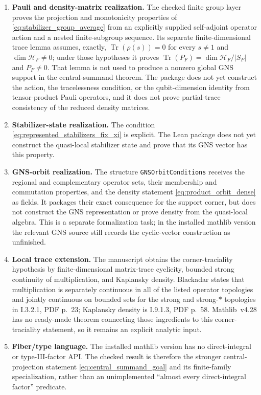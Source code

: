 \documentclass[11pt,reqno]{amsart}
\numberwithin{equation}{section}
\theoremstyle{definition}
\theoremstyle{remark}
\newcommand{\cH}{\mathcal H}
\newcommand{\Tr}{\operatorname{Tr}}
\begin{document}
\begin{enumerate}[label=\textup{(B\arabic*)},leftmargin=3.1em]
  \item \textbf{Pauli and density-matrix realization.}  The checked finite
  group layer proves the projection and monotonicity properties of
  \eqref{eq:stabilizer_group_average} from an explicitly supplied
  self-adjoint operator action and a nested finite-subgroup sequence.  Its
  separate finite-dimensional trace lemma assumes, exactly,
  $\Tr(\rho(s))=0$ for every $s\neq1$ and $\dim\cH_F\neq0$; under those
  hypotheses it proves $\Tr(P_F)=\dim\cH_F/\lvert S_F\rvert$ and
  $P_F\neq0$.  That lemma is not used to produce a nonzero global GNS
  support in the central-summand theorem.  The package does not yet construct
  the action, the tracelessness condition, or the qubit-dimension identity
  from tensor-product Pauli operators, and it does not prove partial-trace
  consistency of the reduced density matrices.
  \item \textbf{Stabilizer-state realization.}  The condition
  \eqref{eq:represented_stabilizers_fix_xi} is explicit.  The Lean package
  does not yet construct the quasi-local stabilizer state and prove that its
  GNS vector has this property.
  \item \textbf{GNS-orbit realization.}  The structure
  \texttt{GNSOrbitConditions} receives the regional and complementary operator
  sets, their membership and commutation properties, and the density statement
  \eqref{eq:product_orbit_dense} as fields.  It packages their exact
  consequence for the support corner, but does not construct the GNS
  representation or prove density from the quasi-local algebra.  This is a
  separate formalization task; in the installed mathlib version the relevant
  GNS source still records the cyclic-vector construction as unfinished.
  \item \textbf{Local trace extension.}  The manuscript obtains the
  corner-traciality hypothesis by
  finite-dimensional matrix-trace cyclicity, bounded strong continuity of
  multiplication, and Kaplansky density.  Blackadar states that multiplication
  is separately continuous in all of the listed operator topologies and jointly
  continuous on bounded sets for the strong and strong-$*$ topologies in
  I.3.2.1, PDF p.~23; Kaplansky density is I.9.1.3, PDF p.~58.
  Mathlib~v4.28 has no ready-made theorem connecting those ingredients to this
  corner-traciality statement, so it remains an explicit analytic input.
  \item \textbf{Fiber/type language.}  The installed mathlib version has no
  direct-integral or type-III-factor API.  The checked result is therefore
  the stronger central-projection statement \eqref{eq:central_summand_goal}
  and its finite-family specialization, rather than an unimplemented
  ``almost every direct-integral factor'' predicate.
\end{enumerate}
\end{document}
